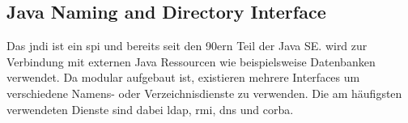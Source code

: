 
\subsection{Java Naming and Directory Interface}\label{subsec:jndi}
Das \gls{jndi} ist ein \gls{spi} und bereits seit den 90ern Teil der Java SE.
 wird zur Verbindung mit externen Java Ressourcen wie beispielsweise Datenbanken verwendet.
Da  modular aufgebaut ist, existieren mehrere Interfaces um verschiedene Namens- oder Verzeichnisdienste zu verwenden.
Die am häufigsten verwendeten Dienste sind dabei \gls{ldap}, \gls{rmi}, \gls{dns} und \gls{corba}.
